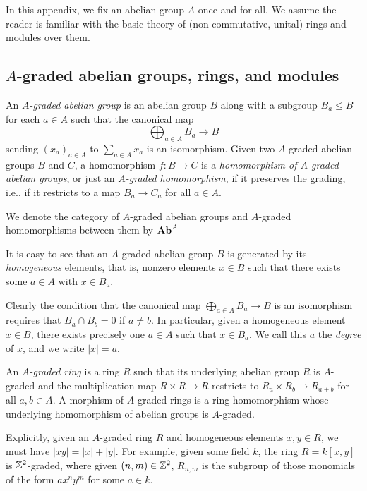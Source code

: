 \documentclass[../main.tex]{subfiles}
\begin{document}
In this appendix, we fix an abelian group $A$ once and for all. We assume the reader is familiar with the basic theory of (non-commutative, unital) rings and modules over them.

\subsection{\texorpdfstring{$A$}{A}-graded abelian groups, rings, and modules}

\begin{definition}\label{graded_abgrp}
	An \emph{$A$-graded abelian group} is an abelian group $B$ along with a subgroup $B_a\leq B$ for each $a\in A$ such that the canonical map
	\[\bigoplus_{a\in A}B_a\to B\]
	sending $(x_a)_{a\in A}$ to $\sum_{a\in A}x_a$ is an isomorphism. Given two $A$-graded abelian groups $B$ and $C$, a homomorphism $f:B\to C$ is a \textit{homomorphism of $A$-graded abelian groups}, or just an \emph{$A$-graded homomorphism}, if it preserves the grading, i.e., if it restricts to a map $B_a\to C_a$ for all $a\in A$. 

	We denote the category of $A$-graded abelian groups and $A$-graded homomorphisms between them by $\mathbf{Ab}^A$
\end{definition}

It is easy to see that an $A$-graded abelian group $B$ is generated by its \emph{homogeneous} elements, that is, nonzero elements $x\in B$ such that there exists some $a\in A$ with $x\in B_a$.

\begin{remark}
	Clearly the condition that the canonical map $\bigoplus_{a\in A}B_a\to B$ is an isomorphism requires that $B_a\cap B_b=0$ if $a\neq b$. In particular, given a homogeneous element $x\in B$, there exists precisely one $a\in A$ such that $x\in B_a$. We call this $a$ the \emph{degree} of $x$, and we write $|x|=a$.
\end{remark}

\begin{definition}
	An \emph{$A$-graded ring} is a ring $R$ such that its underlying abelian group $R$ is $A$-graded and the multiplication map $R\times R\to R$ restricts to $R_a\times R_b\to R_{a+b}$ for all $a,b\in A$. A morphism of $A$-graded rings is a ring homomorphism whose underlying homomorphism of abelian groups is $A$-graded.
\end{definition}

Explicitly, given an $A$-graded ring $R$ and homogeneous elements $x,y\in R$, we must have $|xy|=|x|+|y|$. For example, given some field $k$, the ring $R=k[x,y]$ is $\mathbb{Z}^2$-graded, where given $(n,m)\in\mathbb{Z}^2$, $R_{n,m}$ is the subgroup of those monomials of the form $ax^ny^m$ for some $a\in k$. 
\end{document}
